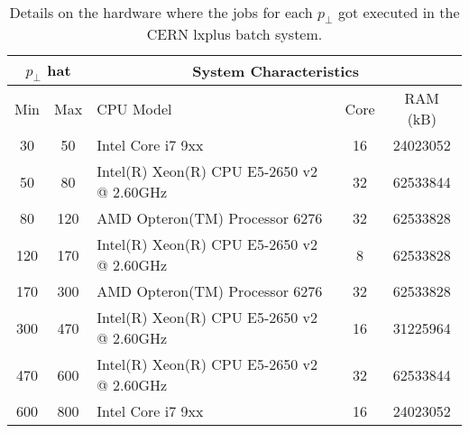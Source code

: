 \begin{table}[htp]
\centering

\begin{tabular}{|c|c|l|c|c|}
\hline
\multicolumn{2}{|c|}{$p_\perp$ hat} & \multicolumn{3}{c|}{System Characteristics} \\
\hline
Min & Max & CPU Model & Core & RAM (kB) \\
\hline
\hline
 30 &  50 & Intel Core i7 9xx                         & 16 & 24023052 \\
 50 &  80 & Intel(R) Xeon(R) CPU E5-2650 v2 @ 2.60GHz & 32 & 62533844 \\
 80 & 120 & AMD Opteron(TM) Processor 6276            & 32 & 62533828 \\
120 & 170 & Intel(R) Xeon(R) CPU E5-2650 v2 @ 2.60GHz &  8 & 62533828 \\
170 & 300 & AMD Opteron(TM) Processor 6276            & 32 & 62533828 \\
300 & 470 & Intel(R) Xeon(R) CPU E5-2650 v2 @ 2.60GHz & 16 & 31225964 \\
470 & 600 & Intel(R) Xeon(R) CPU E5-2650 v2 @ 2.60GHz & 32 & 62533844 \\
600 & 800 & Intel Core i7 9xx                         & 16 & 24023052 \\
\hline	
\end{tabular}

\caption{Details on the hardware where the jobs for each $p_\perp$ got executed in the CERN lxplus batch system.}
\label{table_QCD_ProdUnfiltered_Hardware}
\end{table}